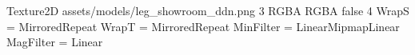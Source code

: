 Texture2D
assets/models/leg_showroom_ddn.png
3
RGBA
RGBA
false
4
WrapS = MirroredRepeat
WrapT = MirroredRepeat
MinFilter = LinearMipmapLinear
MagFilter = Linear
